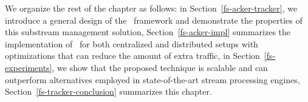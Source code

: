 

We organize the rest of the chapter as follows: in Section~\ref{fs-acker-tracker}, we introduce a general design of the \tracker\ framework and demonstrate the properties of this substream management solution, Section~\ref{fs-acker-impl} summarizes the implementation of \tracker\ for both centralized and distributed setups with optimizations that can reduce the amount of extra traffic, in Section~\ref{fs-experiments}, we show that the proposed technique is scalable and can outperform alternatives employed in state-of-the-art stream processing engines, Section~\ref{fs-tracker-conclusion} summarizes this chapter.